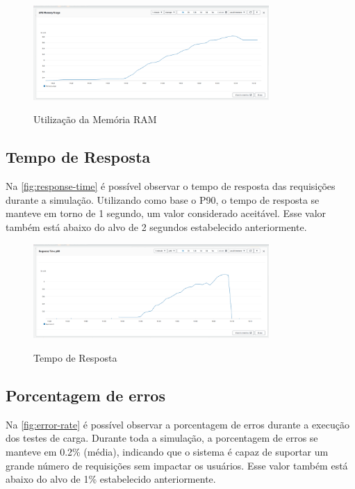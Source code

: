 \begin{figure}[H]
    \centering
    \caption{Utilização da Memória RAM}
    \includegraphics[width=0.8\textwidth]{media/memory-usage.png}
    \label{fig:memory-utilization}
\end{figure}

\subsection{Tempo de Resposta}
Na \autoref{fig:response-time} é possível observar o tempo de resposta das requisições durante a simulação. Utilizando como base o P90, o tempo de resposta se manteve em torno de 1 segundo, um valor considerado aceitável. Esse valor também está abaixo do alvo de 2 segundos estabelecido anteriormente.

\begin{figure}[H]
    \centering
    \caption{Tempo de Resposta}
    \includegraphics[width=0.8\textwidth]{media/response-time.png}
    \label{fig:response-time}
\end{figure}

\subsection{Porcentagem de erros}
Na \autoref{fig:error-rate} é possível observar a porcentagem de erros durante a execução dos testes de carga. Durante toda a simulação, a porcentagem de erros se manteve em 0.2\% (média), indicando que o sistema é capaz de suportar um grande número de requisições sem impactar os usuários. Esse valor também está abaixo do alvo de 1\% estabelecido anteriormente.

